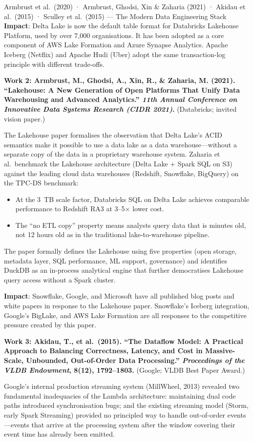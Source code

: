 \begin{researchspotlight}{Armbrust et al.\ (2020) · Armbrust, Ghodsi, Xin
  \& Zaharia (2021) · Akidau et al.\ (2015) · Sculley et al.\ (2015) ---
  The Modern Data Engineering Stack}
\textbf{Impact}: Delta Lake is now the default table format for Databricks
Lakehouse Platform, used by over 7{,}000 organisations. It has been
adopted as a core component of AWS Lake Formation and Azure Synapse
Analytics. Apache Iceberg (Netflix) and Apache Hudi (Uber) adopt the
same transaction-log principle with different trade-offs.

\medskip
\textbf{Work 2: Armbrust, M., Ghodsi, A., Xin, R., \& Zaharia, M. (2021).
``Lakehouse: A New Generation of Open Platforms That Unify Data
Warehousing and Advanced Analytics.'' \textit{11th Annual Conference on
Innovative Data Systems Research (CIDR 2021)}.} (Databricks; invited
vision paper.)

The Lakehouse paper formalises the observation that Delta Lake's ACID
semantics make it possible to use a data lake as a data warehouse---without
a separate copy of the data in a proprietary warehouse system.
Zaharia et al.\ benchmark the Lakehouse architecture (Delta Lake + Spark
SQL on S3) against the leading cloud data warehouses (Redshift, Snowflake,
BigQuery) on the TPC-DS benchmark:
\begin{itemize}
  \item At the 3~TB scale factor, Databricks SQL on Delta Lake achieves
        comparable performance to Redshift RA3 at 3--5$\times$ lower cost.
  \item The ``no ETL copy'' property means analysts query data that is
        minutes old, not 12 hours old as in the traditional lake-to-warehouse
        pipeline.
\end{itemize}
The paper formally defines the Lakehouse using five properties (open
storage, metadata layer, SQL performance, ML support, governance)
and identifies DuckDB as an in-process analytical engine that further
democratises Lakehouse query access without a Spark cluster.

\textbf{Impact}: Snowflake, Google, and Microsoft have all published
blog posts and white papers in response to the Lakehouse paper.
Snowflake's Iceberg integration, Google's BigLake, and AWS Lake Formation
are all responses to the competitive pressure created by this paper.

\medskip
\textbf{Work 3: Akidau, T., et al.\ (2015). ``The Dataflow Model: A
Practical Approach to Balancing Correctness, Latency, and Cost in
Massive-Scale, Unbounded, Out-of-Order Data Processing.''
\textit{Proceedings of the VLDB Endowment}, 8(12), 1792--1803.}
(Google; VLDB Best Paper Award.)

Google's internal production streaming system (MillWheel, 2013) revealed
two fundamental inadequacies of the Lambda architecture: maintaining dual
code paths introduced synchronisation bugs; and the existing streaming
model (Storm, early Spark Streaming) provided no principled way to handle
out-of-order events---events that arrive at the processing system after
the window covering their event time has already been emitted.


\end{researchspotlight}

